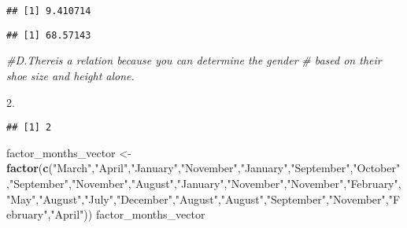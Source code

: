\documentclass[
]{article}
\newenvironment{Shaded}{\begin{snugshade}}{\end{snugshade}}
\newcommand{\CommentTok}[1]{\textcolor[rgb]{0.56,0.35,0.01}{\textit{#1}}}
\newcommand{\FloatTok}[1]{\textcolor[rgb]{0.00,0.00,0.81}{#1}}
\newcommand{\FunctionTok}[1]{\textcolor[rgb]{0.13,0.29,0.53}{\textbf{#1}}}
\newcommand{\NormalTok}[1]{#1}
\newcommand{\OtherTok}[1]{\textcolor[rgb]{0.56,0.35,0.01}{#1}}
\newcommand{\SpecialCharTok}[1]{\textcolor[rgb]{0.81,0.36,0.00}{\textbf{#1}}}
\newcommand{\StringTok}[1]{\textcolor[rgb]{0.31,0.60,0.02}{#1}}
\begin{document}
\begin{Shaded}
\end{Shaded}

\begin{verbatim}
## [1] 9.410714
\end{verbatim}

\begin{Shaded}
\end{Shaded}

\begin{verbatim}
## [1] 68.57143
\end{verbatim}

\begin{Shaded}
\begin{Highlighting}[]
\CommentTok{\#D.Thereis a relation because you can determine the gender}
\CommentTok{\#   based on their shoe size and height alone.}
\end{Highlighting}
\end{Shaded}

\begin{Shaded}
\begin{Highlighting}[]
\FloatTok{2.}
\end{Highlighting}
\end{Shaded}

\begin{verbatim}
## [1] 2
\end{verbatim}

\begin{Shaded}
\begin{Highlighting}[]
\NormalTok{factor\_months\_vector }\OtherTok{\textless{}{-}} \FunctionTok{factor}\NormalTok{(}\FunctionTok{c}\NormalTok{(}\StringTok{"March"}\NormalTok{,}\StringTok{"April"}\NormalTok{,}\StringTok{"January"}\NormalTok{,}\StringTok{"November"}\NormalTok{,}\StringTok{"January"}\NormalTok{,}\StringTok{"September"}\NormalTok{,}\StringTok{"October"}\NormalTok{,}\StringTok{"September"}\NormalTok{,}\StringTok{"November"}\NormalTok{,}\StringTok{"August"}\NormalTok{,}\StringTok{"January"}\NormalTok{,}\StringTok{"November"}\NormalTok{,}\StringTok{"November"}\NormalTok{,}\StringTok{"February"}\NormalTok{,}\StringTok{"May"}\NormalTok{,}\StringTok{"August"}\NormalTok{,}\StringTok{"July"}\NormalTok{,}\StringTok{"December"}\NormalTok{,}\StringTok{"August"}\NormalTok{,}\StringTok{"August"}\NormalTok{,}\StringTok{"September"}\NormalTok{,}\StringTok{"November"}\NormalTok{,}\StringTok{"February"}\NormalTok{,}\StringTok{"April"}\NormalTok{))}
\NormalTok{factor\_months\_vector}
\end{Highlighting}
\end{Shaded}
\end{document}
